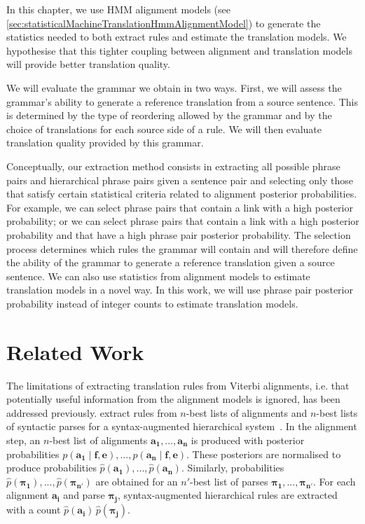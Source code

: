 In this chapter, we use HMM alignment
models (see \autoref{sec:statisticalMachineTranslationHmmAlignmentModel}) to
generate the statistics needed to both extract rules and estimate the
translation models. We hypothesise that this tighter coupling between alignment
and translation models will provide better translation quality.

We will evaluate the grammar we obtain in two ways. First, we will assess the
grammar's ability to generate a reference translation from a source sentence.
This is determined by the type of reordering allowed by the grammar and by
the choice of translations for each source side of a rule. We will then evaluate
translation quality provided by this grammar.

Conceptually, our extraction method consists in extracting all possible phrase
pairs and hierarchical phrase pairs given a sentence pair and selecting only
those that satisfy certain statistical criteria related to alignment posterior
probabilities. For example, we can select phrase pairs that contain a link with
a high posterior probability; or we can select phrase pairs that contain a link
with a high posterior probability and that have a high phrase pair posterior
probability. The selection process determines which rules the grammar will
contain and will therefore define the ability of the grammar to generate a
reference translation given a source sentence. We can also use statistics from
alignment models to estimate translation models in a novel way. In this work, we
will use phrase pair posterior probability instead of integer counts to estimate
translation models.

\section{Related Work}
\label{sec:extractionFromPosteriorRelated}

The limitations of extracting translation rules from Viterbi alignments, i.e.
that potentially useful information from the alignment models is ignored, has
been addressed previously. \citet{venugopal-zollmann-smith-vogel:2008:AMTA}
extract rules from
$n$-best lists of alignments and $n$-best lists of syntactic parses for a
syntax-augmented hierarchical system~\citep{zollmann-venugopal:2006:WMT}.
In the alignment step, an $n$-best list of alignments $\bm{a_1}, ..., \bm{a_n}$ is
produced with posterior probabilities
$p(\bm{a_1} \mid \bm{f}, \bm{e}), ..., p(\bm{a_n} \mid \bm{f}, \bm{e})$. These
posteriors are normalised to produce probabilities
$\hat{p}(\bm{a_1}), ..., \hat{p}(\bm{a_n})$. Similarly, probabilities
$\hat{p}(\bm{\pi_1}), ..., \hat{p}(\bm{\pi_{n'}})$ are obtained
for an $n'$-best list of parses $\bm{\pi_1}, ..., \bm{\pi_{n'}}$. For each alignment
$\bm{a_i}$ and parse $\bm{\pi_j}$, syntax-augmented hierarchical rules are extracted
with a count $\hat{p}(\bm{a_i}) \, \hat{p}(\bm{\pi_j})$.


